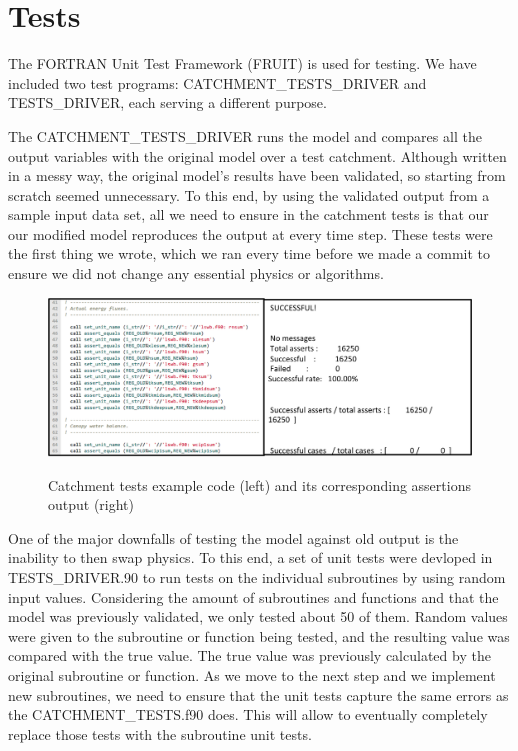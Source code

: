 \documentclass[pdftex,12pt,a4paper]{article}
\begin{document}
\section{Tests}

The FORTRAN Unit Test Framework (FRUIT) is used for testing. We have included two test programs: CATCHMENT\_TESTS\_DRIVER and TESTS\_DRIVER, each serving a different purpose.

\vspace{1em}

The CATCHMENT\_TESTS\_DRIVER runs the model and compares all the output variables with the original model over a test catchment. Although written in a messy way, the original model's results have been validated, so starting from scratch seemed unnecessary. To this end, by using the validated output from a sample input data set, all we need to ensure in the catchment tests is that our our modified model reproduces the output at every time step. These tests were the first thing we wrote, which we ran every time before we made a commit to ensure we did not change any essential physics or algorithms. 

\begin{figure}[h]
	\centering
	\includegraphics[width=5.5in]{Figures/Tests1.png}
	\label{Tests1}
	\caption{Catchment tests example code (left) and its corresponding assertions output (right)}
\end{figure}

One of the major downfalls of testing the model against old output is the inability to then swap physics. To this end, a set of unit tests were devloped in TESTS\_DRIVER.90 to run tests on the individual subroutines by using random input values.  Considering the amount of subroutines and functions and that the model was previously validated, we only tested about 50 of them. Random values were given to the subroutine or function being tested, and the resulting value was compared with the true value. The true value was previously calculated by the original subroutine or function. As we move to the next step and we implement new subroutines, we need to ensure that the unit tests capture the same errors as the CATCHMENT\_TESTS.f90 does. This will allow to eventually completely replace those tests with the subroutine unit tests.
\end{document}
